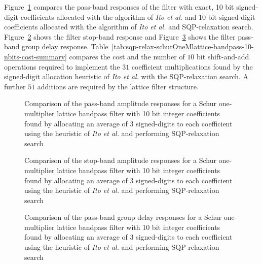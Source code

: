 \documentclass[a4paper,twoside,10pt,english]{report}
\begin{document}
Figure~\ref{fig:sqp-relax-schurOneMlattice-bandpass-10-nbits-pass-response}
compares the pass-band responses of the filter with exact, 10 bit signed-digit
coefficients allocated with the algorithm of \emph{Ito et al.} and 10 bit
signed-digit coefficients allocated with the algorithm of \emph{Ito et al.} and
SQP-relaxation search.
Figure~\ref{fig:sqp-relax-schurOneMlattice-bandpass-10-nbits-stop-response}
shows the filter stop-band response and
Figure~\ref{fig:sqp-relax-schurOneMlattice-bandpass-10-nbits-delay-response}
shows the filter pass-band group delay response.
Table~\ref{tab:sqp-relax-schurOneMlattice-bandpass-10-nbits-cost-summary} 
compares the cost and the number of $10$ bit shift-and-add operations required to
implement the $31$ coefficient multiplications found by the signed-digit 
allocation heuristic of \emph{Ito et al.} with the SQP-relaxation search. A 
further $51$ additions are required by the lattice filter structure.
\begin{figure}[!htbp]
\begin{center}
\scalebox{0.7}{}
\caption{Comparison of the pass-band amplitude responses for a Schur
  one-multiplier lattice bandpass filter with 10 bit integer coefficients found
  by allocating an average of 3 signed-digits to each coefficient using the
  heuristic of \emph{Ito et al.} and performing SQP-relaxation search}
\label{fig:sqp-relax-schurOneMlattice-bandpass-10-nbits-pass-response}
\end{center}
\end{figure}
\begin{figure}[!htbp]
\begin{center}
\scalebox{0.7}{}
\caption{Comparison of the stop-band amplitude responses for a Schur
  one-multiplier lattice bandpass filter with 10 bit integer coefficients found
  by allocating an average of 3 signed-digits to each coefficient using the
  heuristic of \emph{Ito et al.} and performing SQP-relaxation search}
\label{fig:sqp-relax-schurOneMlattice-bandpass-10-nbits-stop-response}
\end{center}
\end{figure}
\begin{figure}[!htbp]
\begin{center}
\scalebox{0.7}{}
\caption{Comparison of the pass-band group delay responses for a Schur
  one-multiplier lattice bandpass filter with 10 bit integer coefficients found
  by allocating an average of 3 signed-digits to each coefficient using the
  heuristic of \emph{Ito et al.} and performing SQP-relaxation search}
\label{fig:sqp-relax-schurOneMlattice-bandpass-10-nbits-delay-response}
\end{center}
\end{figure}
\end{document}
